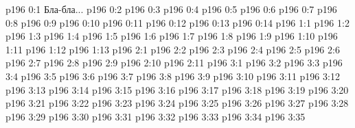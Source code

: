 \author{Промежуточные создания}
\vs p196 0:1  Бла-бла...
\vs p196 0:2 
\vs p196 0:3 
\vs p196 0:4 
\vs p196 0:5 
\vs p196 0:6 
\vs p196 0:7 
\vs p196 0:8 
\vs p196 0:9 
\vs p196 0:10 
\vs p196 0:11 
\vs p196 0:12 
\vs p196 0:13 
\vs p196 0:14 
\vs p196 1:1 
\vs p196 1:2 
\vs p196 1:3 \pc 
\vs p196 1:4 
\vs p196 1:5 
\vs p196 1:6 
\vs p196 1:7 
\vs p196 1:8 
\vs p196 1:9 
\vs p196 1:10 
\vs p196 1:11 
\vs p196 1:12 
\vs p196 1:13 
\vs p196 2:1 
\vs p196 2:2 
\vs p196 2:3 
\vs p196 2:4 
\vs p196 2:5 
\vs p196 2:6 \pc 
\vs p196 2:7 
\vs p196 2:8 
\vs p196 2:9 
\vs p196 2:10 
\vs p196 2:11 
\vs p196 3:1 
\vs p196 3:2 
\vs p196 3:3 
\vs p196 3:4 
\vs p196 3:5 
\vs p196 3:6 
\vs p196 3:7 
\vs p196 3:8 
\vs p196 3:9 
\vs p196 3:10 \pc 
\vs p196 3:11 
\vs p196 3:12 
\vs p196 3:13 
\vs p196 3:14 
\vs p196 3:15 \pc 
\vs p196 3:16 
\vs p196 3:17 
\vs p196 3:18 
\vs p196 3:19 
\vs p196 3:20 
\vs p196 3:21 
\vs p196 3:22 
\vs p196 3:23 
\vs p196 3:24 
\vs p196 3:25 
\vs p196 3:26 
\vs p196 3:27 
\vs p196 3:28 
\vs p196 3:29 \pc 
\vs p196 3:30 \pc 
\vs p196 3:31 \pc 
\vs p196 3:32 
\vs p196 3:33 
\vs p196 3:34 
\vs p196 3:35 
\quizlink
